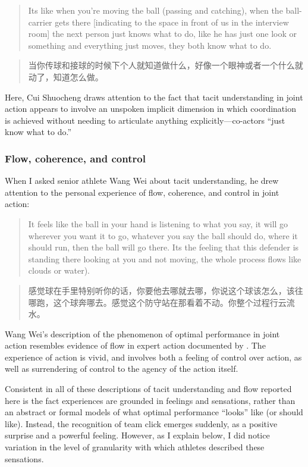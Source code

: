 \begin{CJK}{UTF8}{gbsn}
\begin{quote}
       Its like when you're moving the ball (passing and catching), when the ball-carrier gets there [indicating to the space in front of us in the interview room] the next person just knows what to do, like he has just one look or something and everything just moves, they both know what to do.
\end{quote}

\begin{quote}
     	当你传球和接球的时候下个人就知道做什么，好像一个眼神或者一个什么就动了，知道怎么做。
\end{quote}

Here, Cui Shuocheng draws attention to the fact that tacit understanding in joint action appears to involve an unspoken implicit dimension in which coordination is achieved without needing to articulate anything explicitly---co-actors ``just know what to do.''


\subsubsection{Flow, coherence, and control}
When I asked senior athlete Wang Wei about tacit understanding, he drew attention to the personal experience of flow, coherence, and control in joint action:

  \begin{quote}
    It feels like the ball in your hand is listening to what you say, it will go wherever you want it to go, whatever you say the ball should do, where it should run, then the ball will go there.  Its the feeling that this defender is standing there looking at you and not moving, the whole process flows like clouds or water).
  \end{quote}

  \begin{quote}
    	感觉球在手里特别听你的话，你要他去哪就去哪，你说这个球该怎么，该往哪跑，这个球奔哪去。感觉这个防守站在那看着不动。你整个过程行云流水。
  \end{quote}

Wang Wei's description of the phenomenon of optimal performance in joint action resembles evidence of flow in expert action documented by \textcite{Jackson1992}.  The experience of action is vivid, and involves both a feeling of control over action, as well as surrendering of control to the agency of the action itself.

Consistent in all of these descriptions of tacit understanding and flow reported here is the fact experiences are grounded in feelings and sensations, rather than an abstract or formal models of what optimal performance ``looks'' like (or should like).  Instead, the recognition of team click emerges suddenly, as a positive surprise and a powerful feeling.  However, as I explain below, I did notice variation in the level of granularity with which athletes described these sensations.



\end{CJK}
